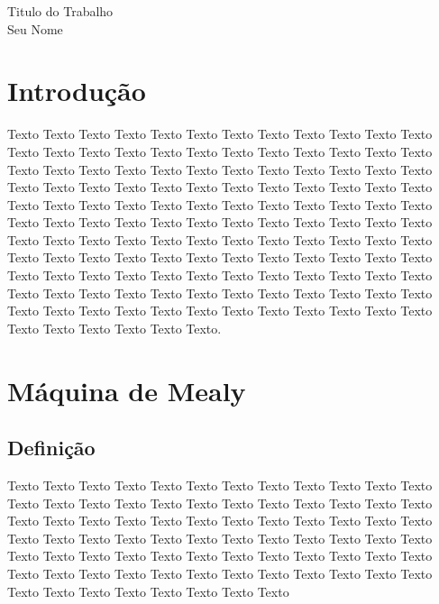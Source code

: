 \documentclass[a4paper]{article}
\begin{document}
\begin{titlepage}
    \begin{center}
       
        {\Huge Titulo do Trabalho} \\[4.9cm]
        {\large Seu Nome} \\[3.5cm]
        \vfill
    \end{center}
\end{titlepage}

\tableofcontents
\cleardoublepage

\section{Introdução}

Texto Texto Texto Texto Texto Texto Texto Texto Texto Texto Texto Texto Texto Texto Texto Texto Texto Texto Texto Texto Texto Texto Texto Texto Texto Texto Texto Texto Texto Texto Texto Texto Texto Texto Texto Texto Texto Texto Texto Texto Texto Texto Texto Texto Texto Texto Texto Texto Texto Texto Texto Texto Texto Texto Texto Texto Texto Texto Texto Texto Texto Texto Texto Texto Texto Texto Texto Texto Texto Texto Texto Texto Texto Texto Texto Texto Texto Texto Texto Texto Texto Texto Texto Texto Texto Texto Texto Texto Texto Texto Texto Texto Texto Texto Texto Texto Texto Texto Texto Texto Texto Texto Texto Texto Texto Texto Texto Texto Texto Texto Texto Texto Texto Texto Texto Texto Texto Texto Texto Texto Texto Texto Texto Texto Texto Texto Texto Texto Texto Texto Texto Texto Texto Texto Texto Texto Texto Texto.

\section{Máquina de Mealy }


\subsection{Definição}

Texto Texto Texto Texto Texto Texto Texto Texto Texto Texto Texto Texto Texto Texto Texto Texto Texto Texto Texto Texto Texto Texto Texto Texto Texto Texto Texto Texto Texto Texto Texto Texto Texto Texto Texto Texto Texto Texto Texto Texto Texto Texto Texto Texto Texto Texto Texto Texto Texto Texto Texto Texto Texto Texto Texto Texto Texto Texto Texto Texto Texto Texto Texto Texto Texto Texto Texto Texto Texto Texto Texto Texto Texto Texto Texto Texto Texto Texto Texto Texto 
\end{document}
